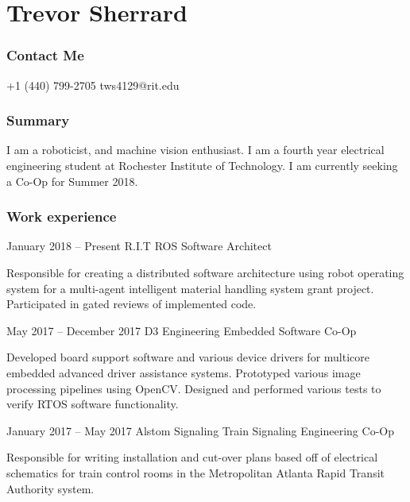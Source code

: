 \documentclass{tccv}
\begin{document}
\part{Trevor Sherrard}
\section{Contact Me}
\begin{eventlist}
    {+1 (440) 799-2705}
    {tws4129@rit.edu}
    
\end{eventlist}

\section{Summary}
I am a roboticist, and machine vision enthusiast. I am a fourth year electrical engineering student at Rochester Institute of Technology. I am currently seeking a Co-Op for Summer 2018. 

\section{Work experience}

\begin{eventlist}

\item{January 2018 -- Present}
     {R.I.T}
     {ROS Software Architect}
     
Responsible for creating a distributed software architecture using robot operating system for a multi-agent intelligent material handling system grant project. Participated in gated reviews of implemented code.   

\item{May 2017 -- December 2017}
     {D3 Engineering}
     {Embedded Software Co-Op}
     
Developed board support software and various device drivers for multicore embedded advanced driver assistance systems. Prototyped various image processing pipelines using OpenCV. Designed and performed various tests to verify RTOS software functionality.

\item{January 2017 -- May 2017}
     {Alstom Signaling}
     {Train Signaling Engineering Co-Op}

Responsible for writing installation and cut-over plans based off of electrical schematics for train control rooms in the Metropolitan Atlanta Rapid Transit Authority system.

\end{eventlist}
\end{document}

